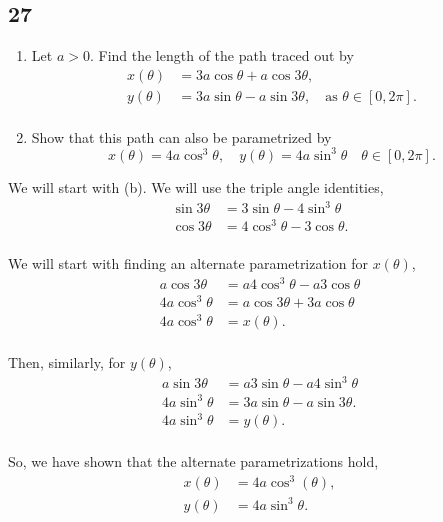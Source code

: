 \documentclass[../hw10]{subfiles}
\begin{document}
\subsection*{27}
\begin{enumerate}[label= (\alph*)]
    \item Let $a>0$. Find the length of the path traced out by
    \begin{align*}
        x(\theta) &= 3a\cos{\theta}+a\cos{3\theta}, \\
        y(\theta) &= 3a\sin{\theta}-a\sin{3\theta}, \quad \text{as $\theta \in [0,2\pi]$}. \\
    \end{align*}
    
    \item Show that this path can also be parametrized by
    \[x(\theta)=4a\cos^3{\theta}, \quad y(\theta)=4a\sin^3{\theta} \quad \theta\in[0,2\pi].\]
\end{enumerate}

We will start with (b). We will use the triple angle identities,
\begin{align*}
    \sin{3\theta} &= 3\sin{\theta}-4\sin^3{\theta} \\
    \cos{3\theta} &= 4\cos^3{\theta}-3\cos{\theta}. \\
\end{align*}

We will start with finding an alternate parametrization for $x(\theta)$,
\begin{align*}
    a\cos{3\theta} &= a4\cos^3{\theta}-a3\cos{\theta} \\
    4a\cos^3{\theta} &= a\cos{3\theta}+3a\cos{\theta} \\
    4a\cos^3{\theta} &= x(\theta). \\
\end{align*}

Then, similarly, for $y(\theta)$,
\begin{align*}
    a\sin{3\theta} &= a3\sin{\theta}-a4\sin^3{\theta} \\
    4a\sin^3{\theta} &= 3a\sin{\theta}-a\sin{3\theta}. \\
    4a\sin^3{\theta} &= y(\theta). \\
\end{align*}

So, we have shown that the alternate parametrizations hold, 
\begin{align*}
    x(\theta) &= 4a\cos^3(\theta), \\
    y(\theta) &= 4a\sin^3{\theta}. \\
\end{align*}
\end{document}
